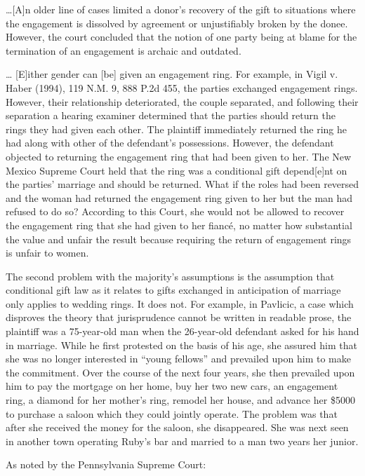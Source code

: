 \dots [A]n older line of cases limited a donor's recovery of the gift to
situations where the engagement is dissolved by agreement or unjustifiably
broken by the donee. However, the court concluded that the notion of one party
being at blame for the termination of an engagement is archaic and outdated. 

\dots{} [E]ither gender can [be] given an engagement ring. For example, in Vigil
v. Haber (1994), 119 N.M. 9, 888 P.2d 455, the parties exchanged engagement
rings. However, their relationship deteriorated, the couple separated, and
following their separation a hearing examiner determined that the parties
should return the rings they had given each other. The plaintiff immediately
returned the ring he had along with other of the defendant's possessions.
However, the defendant objected to returning the engagement ring that had been
given to her. The New Mexico Supreme Court held that the ring was a conditional
gift depend[e]nt on the parties' marriage and should be returned. What if the
roles had been reversed and the woman had returned the engagement ring given to
her but the man had refused to do so? According to this Court, she would not be
allowed to recover the engagement ring that she had given to her fianc\'e, no
matter how substantial the value and unfair the result because requiring the
return of engagement rings is unfair to women.

The second problem with the majority's assumptions is the assumption that
conditional gift law as it relates to gifts exchanged in anticipation of
marriage only applies to wedding rings. It does not. For example, in Pavlicic,
a case which disproves the theory that jurisprudence cannot be written in
readable prose, the plaintiff was a 75-year-old man when the 26-year-old
defendant asked for his hand in marriage. While he first protested on the basis
of his age, she assured him that she was no longer interested in ``young
fellows'' and prevailed upon him to make the commitment. Over the course of the
next four years, she then prevailed upon him to pay the mortgage on her home,
buy her two new cars, an engagement ring, a diamond for her mother's ring,
remodel her house, and advance her \$5000 to purchase a saloon which they could
jointly operate. The problem was that after she received the money for the
saloon, she disappeared. She was next seen in another town operating Ruby's bar
and married to a man two years her junior. 

As noted by the Pennsylvania Supreme Court:

